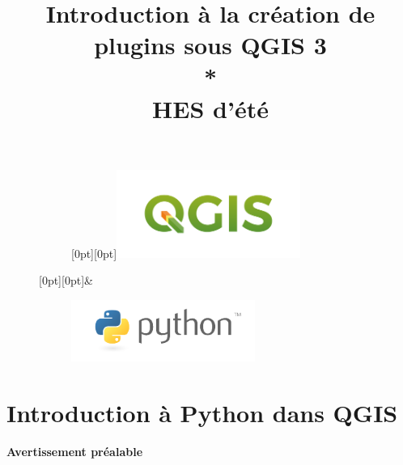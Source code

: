\documentclass[11pt]{article}
\title{
\vspace{-0mm}\Huge{Introduction à la création de plugins sous QGIS 3}\\ 
\vspace*{0.64em}
*\quad*\quad*  \\
\vspace*{0.64em}
\LARGE{HES d'été }
}
\begin{document}
\clearpage
\maketitle

\begin{center}
\begin{figure}[H]
    \centering
    \begin{subfigure}[t]{0.44\textwidth}
    	\centering		
        \raisebox{-8pt}[0pt][0pt]{\includegraphics[width=6cm]{qgis-logo_anita02.png}}
    \end{subfigure}%
    \raisebox{24pt}[0pt][0pt]{\Huge\&\normalsize}
    \begin{subfigure}[t]{0.44\textwidth}
        \centering
        \includegraphics[width=6cm]{python-logo-master-v3-TM-flattened.png}
    \end{subfigure}
\end{figure}
\end{center}
\thispagestyle{empty}

\clearpage %
\begingroup
  \thispagestyle{empty}
  \null
  \newpage
\endgroup

\vspace*{-4em}
\tableofcontents
\vspace*{-1em}
\listoffigures
\vspace*{-1em}
\listoftables



\newpage{}

\pagestyle{fancy}

\section{Introduction à Python dans QGIS}
\label{Introduction}
\textbf{Avertissement préalable}\\\vspace*{-0.4em}
\end{document}

